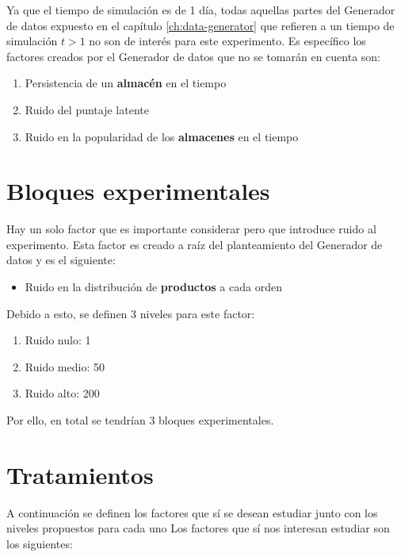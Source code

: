 Ya que el tiempo de simulación es de 1 día, todas aquellas partes del Generador de datos expuesto en el capítulo \ref{ch:data-generator} que refieren a un tiempo de simulación $t>1$ no son de interés para este experimento. Es específico los factores creados por el Generador de datos que no se tomarán en cuenta son:

\begin{enumerate}
    \item Persistencia de un \textbf{almacén} en el tiempo
    \item Ruido del puntaje latente
    \item Ruido en la popularidad de los \textbf{almacenes} en el tiempo
\end{enumerate}

\section{Bloques experimentales}
Hay un solo factor que es importante considerar pero que introduce ruido al experimento. Esta factor es creado a raíz del planteamiento del Generador de datos y es el siguiente:

\begin{itemize}
    \item Ruido en la distribución de \textbf{productos} a cada orden
\end{itemize}

Debido a esto, se definen 3 niveles para este factor:

\begin{enumerate}
    \item Ruido nulo: 1
    \item Ruido medio: 50
    \item Ruido alto: 200
\end{enumerate}

Por ello, en total se tendrían 3 bloques experimentales.

\section{Tratamientos}
A continuación se definen los factores que sí se desean estudiar junto con los niveles propuestos para cada uno
Los factores que sí nos interesan estudiar son los siguientes:

